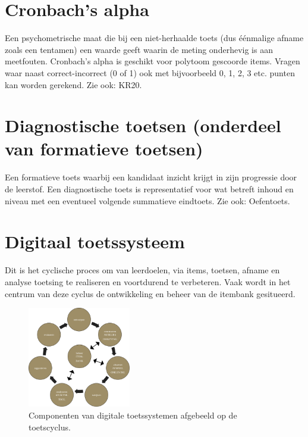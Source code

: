 \documentclass[
  letterpaper,
  DIV=11,
  numbers=noendperiod]{scrreprt}
\begin{document}
\hypertarget{cronbachs-alpha}{%
\section{Cronbach's alpha}\label{cronbachs-alpha}}

Een psychometrische maat die bij een niet-herhaalde toets (dus éénmalige
afname zoals een tentamen) een waarde geeft waarin de meting onderhevig
is aan meetfouten. Cronbach's alpha is geschikt voor polytoom gescoorde
items. Vragen waar naast correct-incorrect (0 of 1) ook met bijvoorbeeld
0, 1, 2, 3 etc. punten kan worden gerekend. Zie ook: KR20.

\hypertarget{diagnostische-toetsen-onderdeel-van-formatieve-toetsen}{%
\section{Diagnostische toetsen (onderdeel van formatieve
toetsen)}\label{diagnostische-toetsen-onderdeel-van-formatieve-toetsen}}

Een formatieve toets waarbij een kandidaat inzicht krijgt in zijn
progressie door de leerstof. Een diagnostische toets is representatief
voor wat betreft inhoud en niveau met een eventueel volgende summatieve
eindtoets. Zie ook: Oefentoets.

\hypertarget{digitaal-toetssysteem}{%
\section{Digitaal toetssysteem}\label{digitaal-toetssysteem}}

Dit is het cyclische proces om van leerdoelen, via items, toetsen,
afname en analyse toetsing te realiseren en voortdurend te verbeteren.
Vaak wordt in het centrum van deze cyclus de ontwikkeling en beheer van
de itembank gesitueerd.

\begin{figure}

{\centering \includegraphics[width=0.4\textwidth,height=\textheight]{./images/ToetsCyclus.svg}

}

\caption{Componenten van digitale toetssystemen afgebeeld op de
toetscyclus.}

\end{figure}
\end{document}

